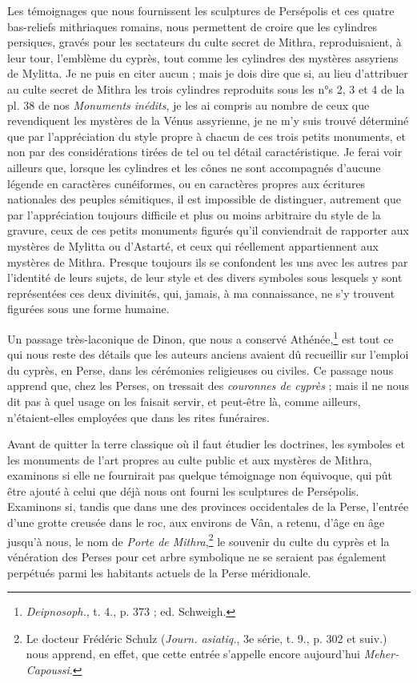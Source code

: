 \documentclass[a4paper, 11pt, oneside, polutonikogreek, french]{article}
\begin{document}
Les témoignages que nous fournissent les sculptures de Persépolis et ces quatre bas-reliefs mithriaques romains, nous permettent de croire que les cylindres persiques, gravés pour les sectateurs du culte secret de Mithra, reproduisaient, à leur tour, l'emblème du cyprès, tout comme les cylindres des mystères assyriens de Mylitta. Je ne puis en citer aucun ; mais je dois dire que si, au lieu d'attribuer au culte secret de Mithra les trois cylindres reproduits sous les n°s 2, 3 et 4 de la pl. 38 de nos \emph{Monuments inédits}, je les ai compris au nombre de ceux que revendiquent les mystères de la Vénus assyrienne, je ne m'y suis trouvé déterminé que par l'appréciation du style propre à chacun de ces trois petits monuments, et non par des considérations tirées de tel ou tel détail caractéristique. Je ferai voir ailleurs que, lorsque les cylindres et les cônes ne sont accompagnés d'aucune légende en caractères cunéiformes, ou en caractères propres aux écritures nationales des peuples sémitiques, il est impossible de distinguer, autrement que par l'appréciation toujours difficile et plus ou moins arbitraire du style de la gravure, ceux de ces petits monuments figurés qu'il conviendrait de rapporter aux mystères de Mylitta ou d'Astarté, et ceux qui réellement appartiennent aux mystères de Mithra. Presque toujours ils se confondent les uns avec les autres par l'identité de leurs sujets, de leur style et des divers symboles sous lesquels y sont représentées ces deux divinités, qui, jamais, à ma connaissance, ne s'y trouvent figurées sous une forme humaine.

Un passage très-laconique de Dinon, que nous a conservé Athénée,\footnote{\emph{Deipnosoph.}, t. 4., p. 373 ; ed. Schweigh.} est tout ce qui nous reste des détails que les auteurs anciens avaient dû recueillir sur l'emploi du cyprès, en Perse, dans les cérémonies religieuses ou civiles. Ce passage nous apprend que, chez les Perses, on tressait des \emph{couronnes de cyprès} ; mais il ne nous dit pas à quel usage on les faisait servir, et peut-être là, comme ailleurs, n'étaient-elles employées que dans les rites funéraires.

Avant de quitter la terre classique où il faut étudier les doctrines, les symboles et les monuments de l'art propres au culte public et aux mystères de Mithra, examinons si elle ne fournirait pas quelque témoignage non équivoque, qui pût être ajouté à celui que déjà nous ont fourni les sculptures de Persépolis. Examinons si, tandis que dans une des provinces occidentales de la Perse, l'entrée d'une grotte creusée dans le roc, aux environs de Vân, a retenu, d'âge en âge jusqu'à nous, le nom de \emph{Porte de Mithra},\footnote{Le docteur Frédéric Schulz (\emph{Journ. asiatiq.}, 3e série, t. 9., p. 302 et suiv.) nous apprend, en effet, que cette entrée s'appelle encore aujourd'hui \emph{Meher-Capoussi}.} le souvenir du culte du cyprès et la vénération des Perses pour cet arbre symbolique ne se seraient pas également perpétués parmi les habitants actuels de la Perse méridionale.
\end{document}

